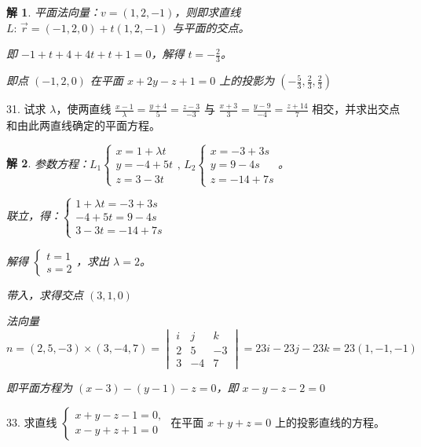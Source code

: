 \documentclass[a4paper,12pt]{article}
\newtheorem*{解}{解}
\begin{document}
\begin{解}
平面法向量：$v=(1,2,-1)$，则即求直线 $L:\,\overrightarrow{r}=(-1,2,0)+t(1,2,-1)$ 与平面的交点。

即 $-1+t+4+4t+t+1=0$，解得 $t=-\frac{2}{3}$。

即点 $(-1, 2, 0)$ 在平面 $x + 2y - z + 1 = 0$ 上的投影为 $(-\frac{5}{3},\frac{2}{3},\frac{2}{3})$
\end{解}

31. 试求 $\lambda$，使两直线 $\frac{x - 1}{\lambda} = \frac{y + 4}{5} = \frac{z - 3}{-3}$ 与 $\frac{x + 3}{3} = \frac{y - 9}{-4} = \frac{z + 14}{7}$ 相交，并求出交点和由此两直线确定的平面方程。

\begin{解}
参数方程：$L_1\begin{cases}
        x=1+\lambda t \\
        y=-4+5t       \\
        z=3-3t
    \end{cases},\,L_2\begin{cases}
        x=-3+3s \\
        y=9-4s  \\
        z=-14+7s
    \end{cases}$。

联立，得：$\begin{cases}
        1+\lambda t=-3+3s \\
        -4+5t=9-4s        \\
        3-3t=-14+7s
    \end{cases}$

解得 $\begin{cases}
        t=1 \\
        s=2
    \end{cases}$，求出 $\lambda=2$。

带入，求得交点 $(3,1,0)$

法向量 $n=(2,5,-3)\times(3,-4,7)=\begin{vmatrix}
        i & j  & k  \\
        2 & 5  & -3 \\
        3 & -4 & 7
    \end{vmatrix}=23i-23j-23k=23(1,-1,-1)$

即平面方程为 $(x-3)-(y-1)-z=0$，即 $x-y-z-2=0$
\end{解}

33. 求直线 $\begin{cases} x + y - z - 1 = 0, \\ x - y + z + 1 = 0 \end{cases}$ 在平面 $x + y + z = 0$ 上的投影直线的方程。
\end{document}
